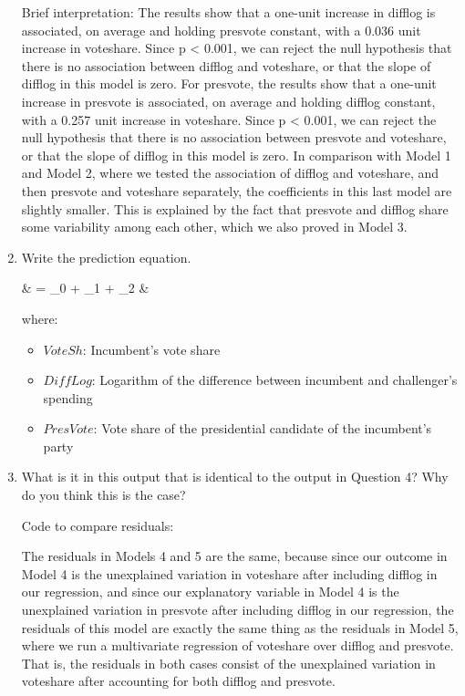 \documentclass[12pt,letterpaper]{article}
\begin{document}
\begin{enumerate}
		Brief interpretation: 
		The results show that a one-unit increase in difflog is associated, on average and holding presvote constant, with a 0.036 unit increase in voteshare. Since p < 0.001, we can reject the null hypothesis that there is no association between difflog and voteshare, or that the slope of difflog in this model is zero. 
		For presvote, the results show that a one-unit increase in presvote is associated, on average and holding difflog constant, with a 0.257 unit increase in voteshare. Since p < 0.001, we can reject the null hypothesis that there is no association between presvote and voteshare, or that the slope of difflog in this model is zero. 
		In comparison with Model 1 and Model 2, where we tested the association of difflog and voteshare, and then presvote and voteshare separately, the coefficients in this last model are slightly smaller. This is explained by the fact that presvote and difflog share some variability among each other, which we also proved in Model 3. 
		
		\item Write the prediction equation. 
		
		{\setlength{\abovedisplayskip}{2pt} 
			\setlength{\belowdisplayskip}{6pt} 
			
			\begin{flalign*}
				& = \beta_0 + \beta_1 \cdot {} + \beta_2 \cdot {} &
			\end{flalign*}
			
			where: 
			
			\begin{itemize}
				\item $VoteSh$: Incumbent's vote share
				\item $DiffLog$: Logarithm of the difference between incumbent and challenger's spending
				\item $PresVote$: Vote share of the presidential candidate of the incumbent's party
			\end{itemize}
		}
		
		\item What is it in this output that is identical to the output in Question 4? Why do you think this is the case? \vspace{.25cm}
		
		Code to compare residuals: 
		
		
		The residuals in Models 4 and 5 are the same, because since our outcome in Model 4 is the unexplained variation in voteshare after including difflog in our regression, and since our explanatory variable in Model 4 is the unexplained variation in presvote after including difflog in our regression, the residuals of this model are exactly the same thing as the residuals in Model 5, where we run a multivariate regression of voteshare over difflog and presvote. That is, the residuals in both cases consist of the unexplained variation in voteshare after accounting for both difflog and presvote. 
		
	\end{enumerate}
\end{document}
